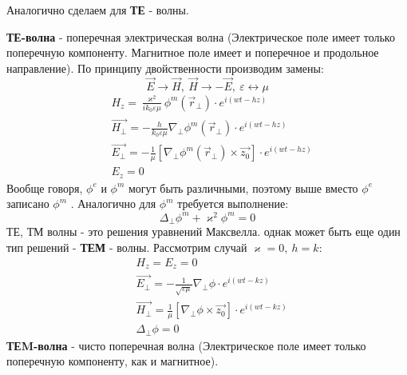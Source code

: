 Аналогично сделаем для \textbf{ТЕ} - волны.

\textbf{ТЕ-волна} - поперечная электрическая волна (Электрическое поле имеет только поперечную компоненту. Магнитное поле имеет и поперечное и
продольное направление). По принципу двойственности производим замены:
\begin{equation}
  \vec{E}\rightarrow\vec{H},~ \vec{H}\rightarrow-\vec{E},~ \varepsilon \leftrightarrow \mu 
\end{equation}
\begin{align*}
  &H_z = \frac{\varkappa^2}{ik_0\varepsilon\mu} \phi^m(\vec{r}_{\perp})\cdot e^{i(wt-hz)}\\
  &\vec{H_{\perp}} = -\frac{h}{k_0\varepsilon\mu}\nabla_{\perp} \phi^m(\vec{r}_{\perp})\cdot e^{i(wt-hz)}\\
  &\vec{E_{\perp}} = -\frac{1}{\mu}[\nabla_{\perp} \phi^m(\vec{r}_{\perp})\times\vec{z_0}]\cdot e^{i(wt-hz)}\\
  &E_z = 0
\end{align*}
Вообще говоря, $\phi^e$ и $\phi^m$ могут быть различными, поэтому выше вместо $\phi^e$ записано $\phi^m$ . Аналогично
для $\phi^m$ требуется выполнение:
\begin{equation}
  \Delta_{\perp}\phi^m+\varkappa^2\phi^m=0
\end{equation}
ТЕ, ТМ волны - это решения уравнений Максвелла. однак может быть еще один тип решений - \textbf{ТЕМ} - волны.
Рассмотрим случай $\varkappa = 0,~ h=k$:
\begin{align*}
  &H_z = E_z = 0 \\
  &\vec{E_{\perp}} = -\frac{1}{\sqrt{\varepsilon\mu}}\nabla_{\perp} \phi\cdot e^{i(wt-kz)}\\
  &\vec{H_{\perp}} = \frac{1}{\mu}[\nabla_{\perp} \phi\times\vec{z_0}]\cdot e^{i(wt-kz)}\\
  &\Delta_{\perp}\phi=0
\end{align*}
\textbf{ТЕM-волна} - чисто поперечная волна (Электрическое поле имеет только поперечную компоненту, как и магнитное).

